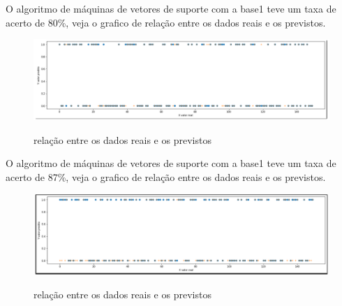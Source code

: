 O algoritmo de máquinas de vetores de suporte com a base1 teve um taxa de acerto de 80\%, veja o grafico de relação entre os dados reais e os previstos.
\begin{figure}[htbp]
	\begin{center}
		\includegraphics[width=0.7\linewidth]{imagens/SVM.png}\\
	\end{center}
	\caption[relação entre os dados reais e os previstos]{relação entre os dados reais e os previstos}
	\label{fig:logo}
\end{figure}

O algoritmo de máquinas de vetores de suporte com a base1 teve um taxa de acerto de 87\%, veja o grafico de relação entre os dados reais e os previstos.
\begin{figure}[htbp]
	\begin{center}
		\includegraphics[width=0.7\linewidth]{imagens/SVMAPI.png}\\
	\end{center}
	\caption[relação entre os dados reais e os previstos]{relação entre os dados reais e os previstos}
	\label{fig:logo}
\end{figure}


